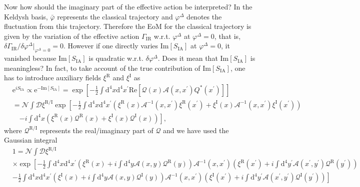 \documentclass[aps, prd
, preprint
, nofootinbib 
]{revtex4-1}
\newcommand{\dd}{\mathrm{d}}
\newcommand{\ee}{\mathrm{e}}
\renewcommand{\Re}{\mathrm{Re}}
\renewcommand{\Im}{\mathrm{Im}}
\newcommand{\bae}[1]{\begin{align} #1 \end{align}}
\begin{document}
Now how should the imaginary part of the effective action be interpreted?
In the Keldysh basis, $\bar{\varphi}$ represents the classical trajectory and $\varphi^\Delta$ denotes the fluctuation from this trajectory.
Therefore the EoM for the classical trajectory is given by the variation of the effective action $\Gamma_\text{IR}$ w.r.t. $\varphi^\Delta$
at $\varphi^\Delta=0$, that is, $\delta\Gamma_\text{IR}/\delta\varphi^\Delta|_{\varphi^\Delta=0}=0$.
However if one directly varies $\Im[S_\text{IA}]$ at $\varphi^\Delta=0$, it vanished because $\Im[S_\text{IA}]$ is quadratic w.r.t. $\delta\varphi^\Delta$.
Does it mean that $\Im[S_\text{IA}]$ is meaningless?
In fact, to take account of the true contribution of $\Im[S_\text{IA}]$,
one has to introduce auxiliary fields $\xi^\text{R}$ and $\xi^\text{I}$ as
\bae{
	&\ee^{iS_\text{IA}}\propto\ee^{-\Im[S_\text{IA}]}=\exp\left[-\frac{1}{2}\int\dd^4x\dd^4x^\prime
	\Re\left[\mathcal{Q}(x)\mathcal{A}(x,x^\prime)Q^*(x^\prime)\right]\right] \nonumber \\
	&=\mathcal{N}\int\mathscr{D}\xi^{\text{R}/\text{I}}\exp\left[-\frac{1}{2}\int\dd^4x\dd^4x^\prime
	\left(\xi^\text{R}(x)\mathcal{A}^{-1}(x,x^\prime)\xi^\text{R}(x^\prime)+\xi^\text{I}(x)\mathcal{A}^{-1}(x,x^\prime)\xi^\text{I}(x^\prime)\right)\right.
	\nonumber \\
	&\quad\left.-i\int\dd^4x(\xi^\text{R}(x)\mathcal{Q}^\text{R}(x)+\xi^\text{I}(x)\mathcal{Q}^\text{I}(x))\right],
}
where $\mathcal{Q}^{\text{R}/\text{I}}$ represents the real/imaginary part of $\mathcal{Q}$ and we have used the Gaussian integral
\bae{
	&1=\mathcal{N}\int\mathscr{D}\xi^{\text{R}/\text{I}} \nonumber \\
	&\times\exp\left[-\frac{1}{2}\int\dd^4x\dd^4x^\prime
	\left(\xi^\text{R}(x)+i\int\dd^4y\mathcal{A}(x,y)\mathcal{Q}^\text{R}(y)\right)\mathcal{A}^{-1}(x,x^\prime)\left(\xi^\text{R}(x^\prime)
	+i\int\dd^4y^\prime\mathcal{A}(x^\prime,y^\prime)\mathcal{Q}^\text{R}(y^\prime)\right)\right. \nonumber \\
	&\left.-\frac{1}{2}\int\dd^4x\dd^4x^\prime
	\left(\xi^\text{I}(x)+i\int\dd^4y\mathcal{A}(x,y)\mathcal{Q}^\text{I}(y)\right)\mathcal{A}^{-1}(x,x^\prime)\left(\xi^\text{I}(x^\prime)
	+i\int\dd^4y^\prime\mathcal{A}(x^\prime,y^\prime)\mathcal{Q}^\text{I}(y^\prime)\right)\right]
}
\end{document}
